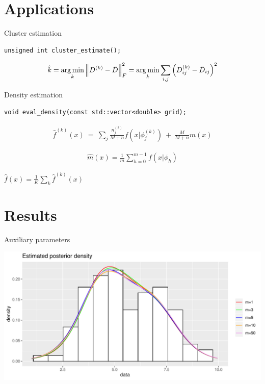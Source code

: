 
\section{Applications}


\begin{frame}[fragile]{Cluster estimation}

\begin{verbatim}
unsigned int cluster_estimate();
\end{verbatim}

$$ \hat{k} = \operatorname*{arg\,min}_k \left \lVert D^{(k)} - \bar D \right\rVert_F^2= \operatorname*{arg\,min}_k \sum_{i,j} \left( D^{(k)}_{ij} - \bar{D}_{ij}  \right)^2$$


\end{frame}

\begin{frame}[fragile]{Density estimation}

\begin{verbatim}
void eval_density(const std::vector<double> grid);

\end{verbatim}

\begin{equation}
	\begin{aligned}
	\hat f^{(k)}(x) \ = \ \sum_j \frac{n^{(k)}_j}{M+n} f\left(x | \phi^{(k)}_j\right) \ + \ \frac{M}{M+n} m(x)
	\end{aligned}
\end{equation}

\begin{equation}
	\begin{aligned}
		\hat m(x) = \frac{1}{m} \sum_{h=0}^{m-1}  f\left(x | \phi_h\right)
	\end{aligned}
\end{equation}


$ \hat f(x) = \frac{1}{K} \sum_k \hat f^{(k)}(x) $

\end{frame}

\section{Results}


\begin{frame}{Auxiliary parameters}

\begin{center}
		\includegraphics[scale=0.5]{etc/dens_withmM10.pdf}
	\end{center}
\end{frame}


